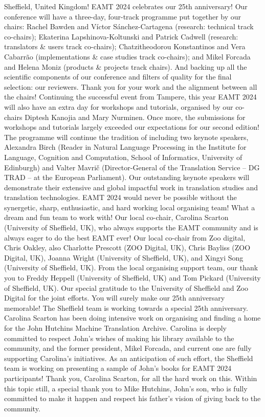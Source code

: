 Sheffield, United Kingdom! EAMT 2024 celebrates our 25th anniversary! Our conference will have a three-day, four-track programme put together by our chairs: Rachel Bawden and Víctor Sánchez-Cartagena (research: technical track co-chairs); Ekaterina Lapshinova-Koltunski and Patrick Cadwell (research: translators \& users track co-chairs); Chatzitheodorou Konstantinos and Vera Cabarrão (implementations \& case studies track co-chairs); and Mikel Forcada and Helena Moniz (products \& projects track chairs). And backing up all the scientific components of our conference and filters of quality for the final selection: our reviewers. Thank you for your work and the alignment between all the chairs!
Continuing the successful event from Tampere, this year EAMT 2024 will also have an extra day for workshops and tutorials, organised by our co-chairs Diptesh Kanojia and Mary Nurminen. Once more, the submissions for workshops and tutorials largely exceeded our expectations for our second edition!
The programme will continue the tradition of including two keynote speakers, Alexandra Birch (Reader in Natural Language Processing in the Institute for Language, Cognition and Computation, School of Informatics, University of Edinburgh) and Valter Mavrič (Director-General of the Translation Service – DG TRAD – at the European Parliament). Our outstanding keynote speakers will demonstrate their extensive and global impactful work in translation studies and translation technologies.
EAMT 2024 would never be possible without the synergetic, sharp, enthusiastic, and hard working local organising team! What a dream and fun team to work with! Our local co-chair, Carolina Scarton (University of Sheffield, UK), who always supports the EAMT community and is always eager to do the best EAMT ever! Our local co-chair from Zoo digital, Chris Oakley, also Charlotte Prescott (ZOO Digital, UK), Chris Bayliss (ZOO Digital, UK), Joanna Wright (University of Sheffield, UK), and Xingyi Song (University of Sheffield, UK). From the local organising support team, our thank you to Freddy Heppell (University of Sheffield, UK) and Tom Pickard (University of Sheffield, UK). Our special gratitude to the University of Sheffield and Zoo Digital for the joint efforts. You will surely make our 25th anniversary memorable!
The Sheffield team is working towards a special 25th anniversary. Carolina Scarton has been doing intensive work on organising and finding a home for the John Hutchins Machine Translation Archive. Carolina is deeply committed to respect John’s wishes of making his library available to the community, and the former president, Mikel Forcada, and current one are fully supporting Carolina’s initiatives. As an anticipation of such effort, the Sheffield team is working on presenting a sample of John’s books for EAMT 2024 participants! Thank you, Carolina Scarton, for all the hard work on this. Within this topic still, a special thank you to Mike Hutchins, John’s son, who is fully committed to make it happen and respect his father’s vision of giving back to the community.
